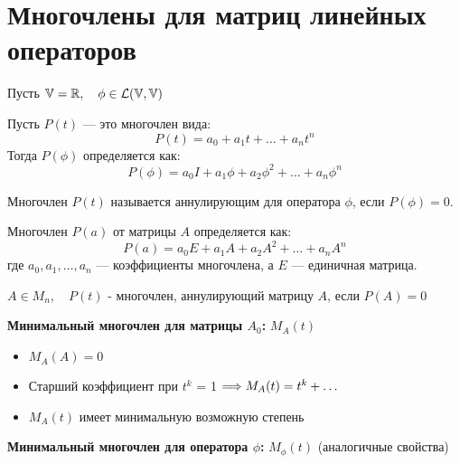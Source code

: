 \section{Многочлены для матриц линейных операторов}

Пусть $ \mathbb{V} = \mathbb{R}, \quad \phi \in \mathcal{L}(\mathbb{V},\mathbb{V})$


\begin{shdef}
\begin{definition}
\leavevmode \nl 

    Пусть $P(t)$ — это многочлен вида:
    \[
    P(t) = a_{0} + a_{1}t + \ldots + a_{n}t^n
    \]
    Тогда $P(\phi)$ определяется как:
    \[
    P(\phi) = a_{0}I + a_{1}\phi + a_{2}\phi^2 + \ldots + a_{n}\phi^n
    \]

    Многочлен $P(t)$ называется аннулирующим для оператора $\phi$, если $P(\phi) = 0$.
\end{definition}

\end{shdef}

\begin{shdef}
    \begin{definition}
    \leavevmode \nl 
    
    Многочлен \( P(a) \) от матрицы \( A \) определяется как:
    \[
    P(a) = a_{0} E + a_{1} A + a_{2} A^2 + \ldots + a_{n} A^n
    \]
    где \( a_0, a_1, \ldots, a_n \) — коэффициенты многочлена, а \( E \) — единичная матрица.
    
    
    \(A \in M_{n}, \quad P(t)\) - многочлен, аннулирующий матрицу $ A$, если \(P(A) = 0\)
\end{definition}
\end{shdef}

\clearpage
\begin{shdef}
    \begin{definition}
    \leavevmode \nl 
    
        \textbf{Минимальный многочлен для матрицы \(A_0\):} \(M_{A}(t)\) \\
        \begin{itemize}
            \item \(M_{A}(A) = 0\)
            \item Старший коэффициент при $ t^k $ = 1 \; $ \Longrightarrow M_{A}(t) = t^k + \ldots $ 
            \item \(M_{A}(t)\) имеет минимальную возможную степень
        \end{itemize}
        
        \textbf{Минимальный многочлен для оператора \(\phi\):} \(M_{\phi}(t)\) (аналогичные свойства)
    \end{definition}
\end{shdef}

